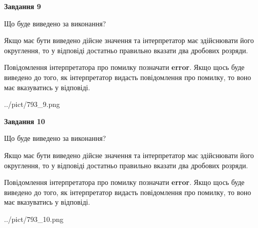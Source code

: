 \documentclass[12pt, ukrainian]{article}
\begin{document}
{\begin {Large}
{\begin {center}\textbf{Завдання 9}\end {center}}\par
Що буде виведено за виконання? \par

Якщо має бути виведено дійсне значення та інтерпретатор має здійснювати його округлення, 
то у відповіді достатньо правильно вказати два дробових розряди.

Повідомлення інтерпретатора про помилку позначати \textbf{error}.
Якщо щось буде виведено до того, як інтерпретатор видасть повідомлення про помилку, 
то воно має вказуватись у відповіді. \par

\begin{center}
	{../pict/793_9.png}
\end{center}
\newpage

{\begin {center}\textbf{Завдання 10}\end {center}}\par
Що буде виведено за виконання? \par

Якщо має бути виведено дійсне значення та інтерпретатор має здійснювати його округлення, 
то у відповіді достатньо правильно вказати два дробових розряди.

Повідомлення інтерпретатора про помилку позначати \textbf{error}.
Якщо щось буде виведено до того, як інтерпретатор видасть повідомлення про помилку, 
то воно має вказуватись у відповіді. \par

\begin{center}
	{../pict/793_10.png}
\end{center}
\newpage

\end {Large}}
\end{document}
